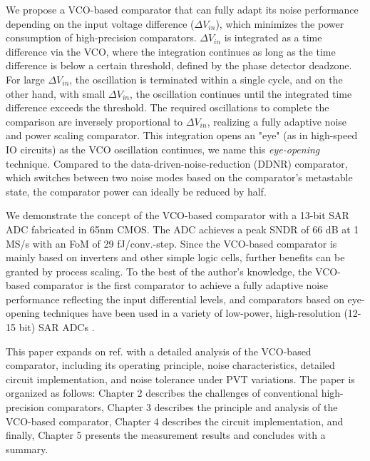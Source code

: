 \documentclass[journal]{IEEEtran}
\begin{document}
We propose a VCO-based comparator that can fully adapt its noise performance depending on the input voltage difference ($\Delta V_{in}$), which minimizes the power consumption of high-precision comparators\cite{yoshioka201413b}. $\Delta V_{in}$ is integrated as a time difference via the VCO, where the integration continues as long as the time difference is below a certain threshold, defined by the phase detector deadzone. For large $\Delta V_{in}$, the oscillation is terminated within a single cycle, and on the other hand, with small $\Delta V_{in}$, the oscillation continues until the integrated time difference exceeds the threshold. The required oscillations to complete the comparison are inversely proportional to $\Delta V_{in}$, realizing a fully adaptive noise and power scaling comparator. This integration opens an "eye" (as in high-speed IO circuits) as the VCO oscillation continues, we name this \textit{eye-opening} technique. 
Compared to the data-driven-noise-reduction (DDNR) comparator\cite{harpe201310b}, which switches between two noise modes based on the comparator's metastable state, the comparator power can ideally be reduced by half.

We demonstrate the concept of the VCO-based comparator with a 13-bit SAR ADC fabricated in 65nm CMOS. The ADC achieves a peak SNDR of 66 dB at 1 MS/s with an FoM of 29 fJ/conv.-step. Since the VCO-based comparator is mainly based on inverters and other simple logic cells, further benefits can be granted by process scaling.
To the best of the author's knowledge, the VCO-based comparator is the first comparator to achieve a fully adaptive noise performance reflecting the input differential levels, and comparators based on eye-opening techniques have been used in a variety of low-power, high-resolution (12-15 bit) SAR ADCs \cite{ding20190, luo2020input, hsieh20180, li2019design, li202065, almarashli2017nyquist, shim2017edge, zhu201914, pan202012, lee2019fast, vogelmann2020efficient}.

This paper expands on ref.\cite{yoshioka201413b} with a detailed analysis of the VCO-based comparator, including its operating principle, noise characteristics, detailed circuit implementation, and noise tolerance under PVT variations.
The paper is organized as follows: Chapter 2 describes the challenges of conventional high-precision comparators, Chapter 3 describes the principle and analysis of the VCO-based comparator, Chapter 4 describes the circuit implementation, and finally, Chapter 5 presents the measurement results and concludes with a summary.
\end{document}
